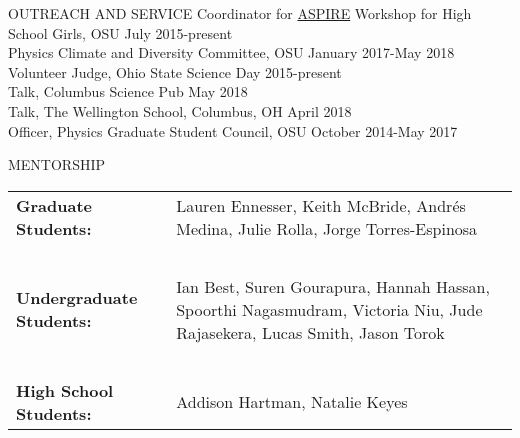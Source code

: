 \documentclass{resume} %
\begin{document}
\begin{rSection}{OUTREACH AND SERVICE}
Coordinator for \href{u.osu.edu/aspire}{ASPIRE} Workshop for High School Girls, OSU \hfill July 2015-present\\
Physics Climate and Diversity Committee, OSU \hfill January 2017-May 2018\\
Volunteer Judge, Ohio State Science Day \hfill 2015-present\\
Talk, Columbus Science Pub \hfill  May 2018\\
Talk, The Wellington School, Columbus, OH \hfill April 2018\\
Officer, Physics Graduate Student Council, OSU \hfill October 2014-May 2017 \\
\end{rSection}
\vspace{-0.30cm}


\begin{rSection}{MENTORSHIP}
\begin{table}[h]
\begin{tabularx}{\textwidth}{l X}
 {\bf Graduate Students:}  & Lauren Ennesser, Keith McBride, Andr\'es Medina, Julie Rolla,  \hspace{1cm} Jorge Torres-Espinosa \\
 ~ & ~ \\
{\bf Undergraduate Students:}  & Ian Best, Suren Gourapura, Hannah Hassan, Spoorthi Nagasmudram, Victoria Niu, Jude Rajasekera, Lucas Smith, Jason Torok \\
~ & ~ \\
{\bf High School Students:} &  Addison Hartman, Natalie Keyes\\
\end{tabularx}
\end{table}
\end{rSection}
\end{document}
